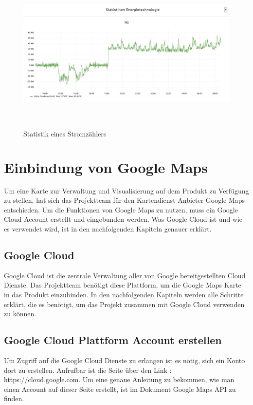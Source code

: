  
\begin{figure}[h]
	\centering
	\includegraphics[height=8cm,width=14cm]{images/bspstatistik1}
	\caption{Statistik eines Stromzählers}
	\label{fig:Statistikbeispielstromzaehler }
\end{figure} 



\section{Einbindung von Google Maps}
Um eine Karte zur Verwaltung und Visualisierung auf dem Produkt zu Verfügung zu stellen, hat sich das Projektteam für den Kartendienst Anbieter Google Maps entschieden. Um die Funktionen von Google Maps zu nutzen, muss ein Google Cloud Account erstellt und eingebunden werden. Was Google Cloud ist und wie es verwendet wird, ist in den nachfolgenden Kapiteln genauer erklärt.

\subsection{Google Cloud} \label{sec: Google Cloud}
Google Cloud ist die zentrale Verwaltung aller von Google bereitgestellten Cloud Dienste. Das Projektteam benötigt diese Plattform, um die Google Maps Karte in das Produkt einzubinden. In den nachfolgenden Kapiteln werden alle Schritte erklärt, die es benötigt, um das Projekt zusammen mit Google Cloud verwenden zu können.


\subsection{Google Cloud Plattform Account erstellen}
Um Zugriff auf die Google Cloud Dienste zu erlangen ist es nötig, sich ein Konto dort zu erstellen. Aufrufbar ist die Seite über den Link : https://cloud.google.com.  Um eine genaue Anleitung zu bekommen, wie man einen Account auf dieser Seite erstellt, ist im Dokument Google Maps API zu finden.

